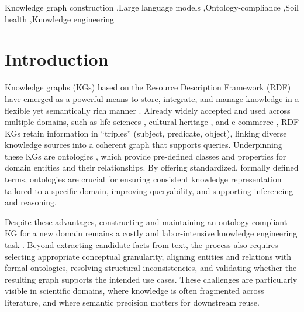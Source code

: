 \documentclass[preprint,12pt]{elsarticle}
\begin{document}
\begin{frontmatter}
\begin{keyword}


Knowledge graph construction \sep Large language models \sep Ontology-compliance \sep Soil health \sep Knowledge engineering
\end{keyword}
\end{frontmatter}

\linenumbers


\section{Introduction}\label{sec1}
Knowledge graphs (KGs) based on the Resource Description Framework (RDF) have emerged as a powerful means to store, integrate, and manage knowledge in a flexible yet semantically rich manner \citep{10.1145/3447772}. Already widely accepted and used across multiple domains, such as life sciences \citep{Smith2007-xn}, cultural heritage \citep{10.1007/978-3-031-33455-9_30}, and e-commerce \citep{regino2024generating}, RDF KGs retain information in ``triples'' (subject, predicate, object), linking diverse knowledge sources into a coherent graph that supports queries.
Underpinning these KGs are ontologies \citep{10.1145/3447772}, which provide pre-defined classes and properties for domain entities and their relationships. By offering standardized, formally defined terms, ontologies are crucial for ensuring consistent knowledge representation tailored to a specific domain, improving queryability, and supporting inferencing and reasoning.

Despite these advantages, constructing and maintaining an ontology-compliant \citep{10.1007/978-3-031-43458-7_48} KG for a new domain remains a costly and labor-intensive knowledge engineering task \citep{KOUTSIANA2026100873}. Beyond extracting candidate facts from text, the process also requires selecting appropriate conceptual granularity, aligning entities and relations with formal ontologies, resolving structural inconsistencies, and validating whether the resulting graph supports the intended use cases. These challenges are particularly visible in scientific domains, where knowledge is often fragmented across literature, and where semantic precision matters for downstream reuse.
\end{document}
